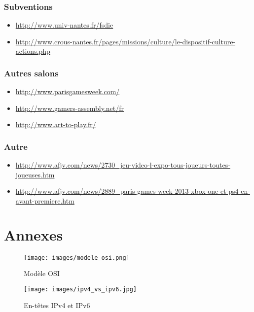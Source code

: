 \documentclass[french]{article}
\begin{document}
\subsubsection*{Subventions}
\begin{itemize}
\item \url{http://www.univ-nantes.fr/fsdie}
\item \url{http://www.crous-nantes.fr/pages/missions/culture/le-dispositif-culture-actions.php}
\end{itemize}

\subsubsection*{Autres salons}
\begin{itemize}
\item \url{http://www.parisgamesweek.com/}
\item \url{http://www.gamers-assembly.net/fr}
\item \url{http://www.art-to-play.fr/}
\end{itemize}

\subsubsection*{Autre}
\begin{itemize}
\item \url{http://www.afjv.com/news/2730_jeu-video-l-expo-tous-joueurs-toutes-joueuses.htm}
\item \url{http://www.afjv.com/news/2889_paris-games-week-2013-xbox-one-et-ps4-en-avant-premiere.htm}
\end{itemize}

\newpage
\section{Annexes}

\hypertarget{modele_osi}{}
\begin{figure}[h]
	\texttt{[image: images/modele\_osi.png]}
	\caption{Modèle OSI}
	\label{fig:Modèle OSI}
\end{figure} 

\hypertarget{ipv4_vs_ipv6}{}
\begin{figure}[h]
	\texttt{[image: images/ipv4\_vs\_ipv6.jpg]}
	\caption{En-têtes IPv4 et IPv6}
	\label{fig:En-têtes IPv4 et IPv6}
\end{figure} 
\end{document}
